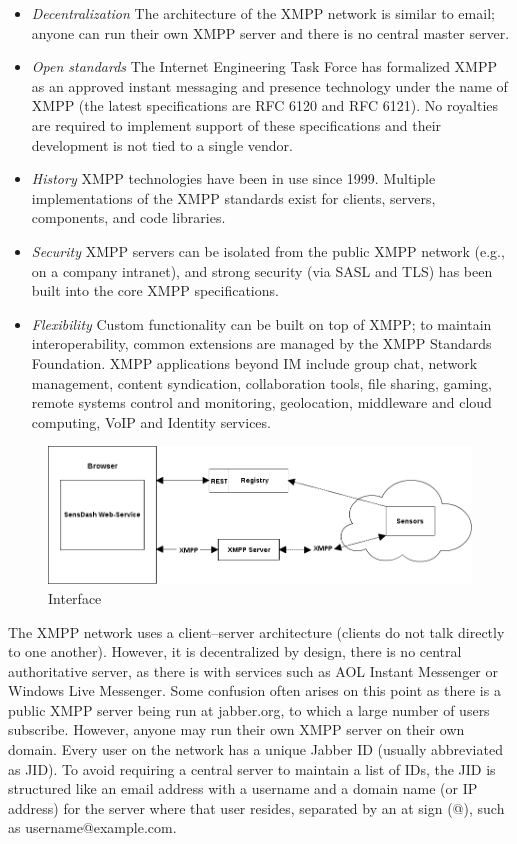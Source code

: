     \begin{itemize}
      \item \emph{Decentralization}
        The architecture of the XMPP network is similar to email; anyone can run their own XMPP server and there is no central master server.
     \item \emph{Open standards}
        The Internet Engineering Task Force has formalized XMPP as an approved instant messaging and presence technology under the name of XMPP (the latest specifications are RFC 6120 and RFC 6121). No royalties are required to implement support of these specifications and their development is not tied to a single vendor.
      \item \emph{History}
        XMPP technologies have been in use since 1999. Multiple implementations of the XMPP standards exist for clients, servers, components, and code libraries.
      \item \emph{Security}
        XMPP servers can be isolated from the public XMPP network (e.g., on a company intranet), and strong security (via SASL and TLS) has been built into the core XMPP specifications.
      \item \emph{Flexibility}
        Custom functionality can be built on top of XMPP; to maintain interoperability, common extensions are managed by the XMPP Standards Foundation. XMPP applications beyond IM include group chat, network management, content syndication, collaboration tools, file sharing, gaming, remote systems control and monitoring, geolocation, middleware and cloud computing, VoIP and Identity services.
      \end{itemize}

      \begin{figure}[!ht]
      \centering
      \includegraphics[scale=0.5]{images/Interface.png}   
      \caption[Interface]{Interface}
      \label{img:interfaces}                           
      \end{figure}

      The XMPP network uses a client–server architecture (clients do not talk directly to one another). However, it is decentralized by design, there is no central authoritative server, as there is with services such as AOL Instant Messenger or Windows Live Messenger. Some confusion often arises on this point as there is a public XMPP server being run at jabber.org, to which a large number of users subscribe. However, anyone may run their own XMPP server on their own domain.
      Every user on the network has a unique Jabber ID (usually abbreviated as JID). To avoid requiring a central server to maintain a list of IDs, the JID is structured like an email address with a username and a domain name (or IP address) for the server where that user resides, separated by an at sign (@), such as username@example.com.

